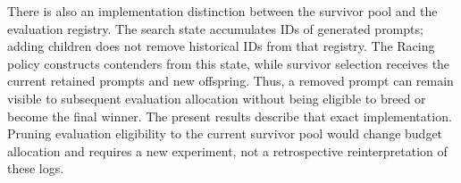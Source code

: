 There is also an implementation distinction between the survivor pool and the
evaluation registry. The search state accumulates IDs of generated prompts;
adding children does not remove historical IDs from that registry. The Racing
policy constructs contenders from this state, while survivor selection receives
the current retained prompts and new offspring. Thus, a removed prompt can
remain visible to subsequent evaluation allocation without being eligible to
breed or become the final winner. The present results describe that exact
implementation. Pruning evaluation eligibility to the current survivor pool
would change budget allocation and requires a new experiment, not a retrospective
reinterpretation of these logs.
